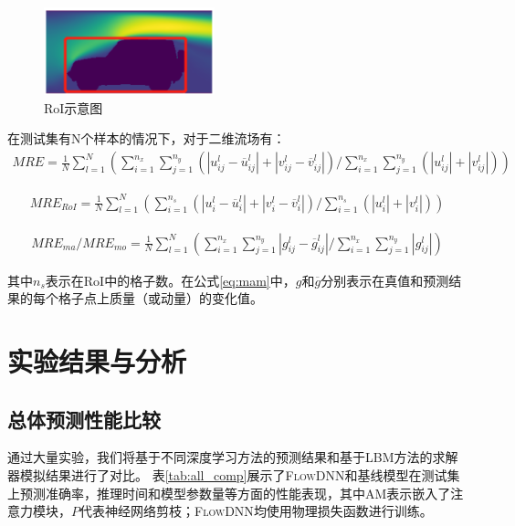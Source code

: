 \begin{figure}[htp]
	\centering
	\includegraphics[width=0.44\textwidth]{figures/data/data_rep/errors.png}
	\caption{RoI示意图}	
	\label{fig:errors_area}
\end{figure}

在测试集有N个样本的情况下，对于二维流场有：
\begin{align}
MRE = { \frac{1}{N} \sum\limits_{l = 1}^N  \left( {\sum\limits_{i = 1}^{{n_x}} {\sum\limits_{j = 1}^{{n_y}} {\left( {\left| {u_{ij}^l - \overline u _{ij}^l} \right| + \left| {v_{ij}^l - \overline v _{ij}^l} \right|} \right)} } } / {{\sum\limits_{i = 1}^{{n_x}} {\sum\limits_{j = 1}^{{n_y}} {\left( {\left| {u _{ij}^l} \right| + \left| { v _{ij}^l} \right|} \right)} } }} \right) }
\end{align}

\begin{align}
MRE_{RoI} = { \frac{1}{N} \sum\limits_{l = 1}^N \left( { {\sum\limits_{i = 1}^{{n_s}} {\left( {\left|
					{u_{i}^l - \overline u _{i}^l} \right| + \left| {v_{i}^l - \overline v _{i}^l} \right|} \right)} } } /  {{ {\sum\limits_{i = 1}^{{n_s}}
				{\left( {\left| {u _{i}^l} \right| + \left| { v _{i}^l} \right|} \right)} } }} \right)}
\end{align}

\begin{align}
MRE_{ma} / MRE_{mo} = { \frac{1}{N} \sum\limits_{l = 1}^N  \left({\sum\limits_{i = 1}^{{n_x}} {\sum\limits_{j = 1}^{{n_y}} { {\left| {g_{ij}^l - \overline g _{ij}^l} \right| } } } } /  {{\sum\limits_{i =1}^{{n_x}} {\sum\limits_{j = 1}^{{n_y}} { {\left| {g _{ij}^l} \right|} } } }} \right)} 
\label{eq:mam}
\end{align}

\noindent 其中$n_s$表示在RoI中的格子数。在公式\ref{eq:mam}中，$g$和$\overline g$分别表示在真值和预测结果的每个格子点上质量（或动量）的变化值。



\section{实验结果与分析}

\subsection{总体预测性能比较}
通过大量实验，我们将基于不同深度学习方法的预测结果和基于LBM方法的求解器模拟结果进行了对比。
表\ref{tab:all_comp}展示了\textsc{FlowDNN}和基线模型在测试集上预测准确率，推理时间和模型参数量等方面的性能表现，其中AM表示嵌入了注意力模块，$P$代表神经网络剪枝；\textsc{FlowDNN}均使用物理损失函数进行训练。

